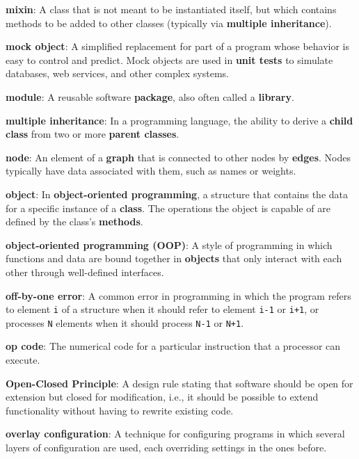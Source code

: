 \documentclass{scrbook}
\newcommand{\glosskey}[1]{\textbf{#1}}
\begin{document}
\noindent \textbf{\glosskey{mixin}}: 
A class that is not meant to be instantiated itself, but which contains methods to be added to other classes (typically via \glosskey{multiple inheritance}).


\noindent \textbf{\glosskey{mock object}}: 
A simplified replacement for part of a program whose behavior is easy to control and predict. Mock objects are used in \glosskey{unit tests} to simulate databases, web services, and other complex systems.


\noindent \textbf{\glosskey{module}}: 
A reusable software \glosskey{package}, also often called a \glosskey{library}.


\noindent \textbf{\glosskey{multiple inheritance}}: 
In a programming language, the ability to derive a \glosskey{child class} from two or more \glosskey{parent classes}.


\noindent \textbf{\glosskey{node}}: 
An element of a \glosskey{graph} that is connected to other nodes by \glosskey{edges}. Nodes typically have data associated with them, such as names or weights.


\noindent \textbf{\glosskey{object}}: 
In \glosskey{object-oriented programming}, a structure that contains the data for a specific instance of a \glosskey{class}. The operations the object is capable of are defined by the class's \glosskey{methods}.


\noindent \textbf{\glosskey{object-oriented programming} (OOP)}: 
A style of programming in which functions and data are bound together in \glosskey{objects} that only interact with each other through well-defined interfaces.


\noindent \textbf{\glosskey{off-by-one error}}: 
A common error in programming in which the program refers to element \texttt{i} of a structure when it should refer to element \texttt{i-1} or \texttt{i+1}, or processes \texttt{N} elements when it should process \texttt{N-1} or \texttt{N+1}.


\noindent \textbf{\glosskey{op code}}: 
The numerical code for a particular instruction that a processor can execute.


\noindent \textbf{\glosskey{Open-Closed Principle}}: 
A design rule stating that software should be open for extension but closed for modification, i.e., it should be possible to extend functionality without having to rewrite existing code.


\noindent \textbf{\glosskey{overlay configuration}}: 
A technique for configuring programs in which several layers of configuration are used, each overriding settings in the ones before.
\end{document}
